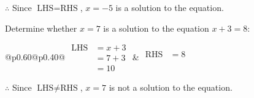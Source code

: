 \documentclass[12pt]{article}
\newcounter{minipagecount}
\begin{document}
\begin{multicols}{2}
\begin{minipage}[t]{0.40\textwidth}
    \noindent \(\therefore\) Since \(\text{LHS} = \text{RHS}\), \(x = -5\) is  a solution to the equation.

\end{minipage}

 \vspace*{16pt}
\noindent{(\theminipagecount)}\hspace{0.1mm} %
\begin{minipage}[t]{0.40\textwidth} %

    \noindent Determine whether \(x = 7\) is a solution to the equation \(x + 3 = 8\):
    \vspace{4pt}  %

    \noindent
    \renewcommand{\arraystretch}{1.3} %
    \begin{tabular}{@{}p{0.60\linewidth}@{}p{0.40\linewidth}@{}}
        \(\begin{aligned}
            \text{LHS} &= x + 3 \\
                    &= 7 + 3 \\
                    &= 10
        \end{aligned}\) &
        \(\begin{aligned}
            \text{RHS} &= 8\\
                    & \\
                    &
        \end{aligned}\)
    \end{tabular}
    \renewcommand{\arraystretch}{1.0} %
    \vspace{2pt}  %

    \noindent \(\therefore\) Since \(\text{LHS} \neq \text{RHS}\), \(x = 7\) is not  a solution to the equation.

\end{minipage}

 \vspace*{16pt}
\noindent{(\theminipagecount)}\hspace{0.1mm} %
\begin{minipage}[t]{0.40\textwidth} %


\end{minipage}
\end{multicols}
\end{document}
